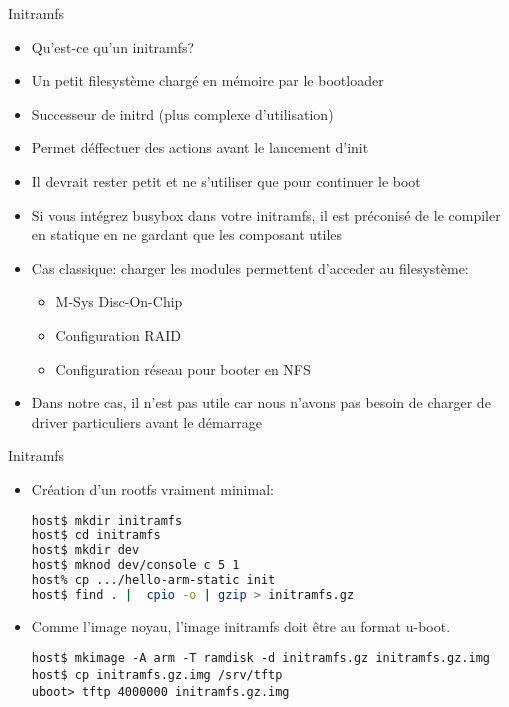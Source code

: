 \begin{frame}[fragile=singleslide]{Initramfs}
  \begin{itemize}
  \item Qu'est-ce qu'un initramfs?
  \item Un petit filesystème chargé en mémoire par le bootloader
  \item Successeur de initrd (plus complexe d'utilisation)
  \item Permet déffectuer des actions avant le lancement d'init
  \item Il devrait rester petit et ne s'utiliser que pour continuer le
    boot
  \item  Si  vous  intégrez  busybox  dans  votre  initramfs,  il  est
    préconisé  de  le compiler  en  statique  en  ne gardant  que  les
    composant utiles
  \item  Cas classique:  charger les  modules permettent  d'acceder au
    filesystème:
    \begin{itemize}
    \item M-Sys Disc-On-Chip
    \item Configuration RAID
    \item Configuration réseau pour booter en NFS
    \end{itemize}
  \item Dans notre cas, il n'est pas utile car nous n'avons pas besoin
    de charger de driver particuliers avant le démarrage
  \end{itemize}
\end{frame}  

\begin{frame}[fragile=singleslide]{Initramfs}
  \begin{itemize} 
  \item Création d'un rootfs vraiment minimal:
    \begin{lstlisting}[language=sh]
host$ mkdir initramfs
host$ cd initramfs
host$ mkdir dev
host$ mknod dev/console c 5 1
host% cp .../hello-arm-static init
host$ find . |  cpio -o | gzip > initramfs.gz
    \end{lstlisting}
  \item Comme l'image noyau, l'image initramfs doit être au format u-boot.
    \begin{lstlisting} 
host$ mkimage -A arm -T ramdisk -d initramfs.gz initramfs.gz.img
host$ cp initramfs.gz.img /srv/tftp
uboot> tftp 4000000 initramfs.gz.img
    \end{lstlisting}
  \end{itemize}
\end{frame}

